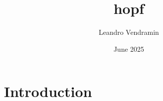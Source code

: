 \documentclass{article}
\title{hopf}
\author{Leandro Vendramin}
\date{June 2025}
\begin{document}
\maketitle

\section{Introduction}
\end{document}
